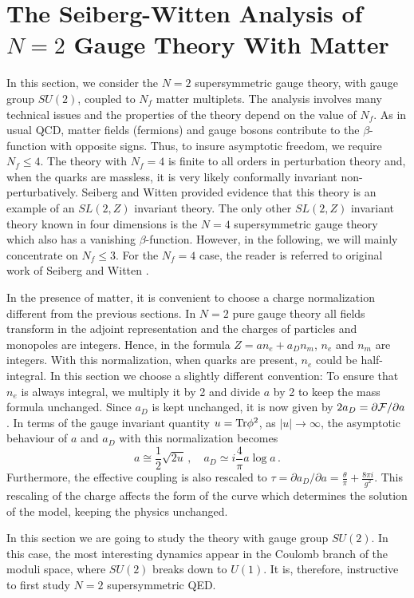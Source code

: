 \section{The Seiberg-Witten Analysis of $N=2$ Gauge Theory With Matter}

In this section, we consider the $N=2$ supersymmetric gauge theory,
with gauge group $SU(2)$, coupled to $N_f$ matter multiplets. The
analysis involves many technical issues and the properties of the
theory depend on the value of $N_f$. As in usual QCD, matter fields
(fermions) and gauge bosons contribute to the $\beta$-function with
opposite signs. Thus, to insure asymptotic freedom, we require $N_f
\leq 4$. The theory with $N_f =4$ is finite to all orders in
perturbation theory and, when the quarks are massless, it is very
likely conformally invariant non-perturbatively. Seiberg and Witten
provided evidence that this theory is an example of an $SL(2,Z)$
invariant theory. The only other $SL(2,Z)$ invariant theory known in
four dimensions is the $N=4$ supersymmetric gauge theory which also
has a vanishing $\beta$-function. However, in the following, we will
mainly concentrate on $N_f\leq 3$. For the $N_f=4$ case, the reader is
referred to original work of Seiberg and Witten \cite{SW2}.

In the presence of matter, it is convenient to choose a charge
normalization different from the previous sections. In $N=2$ pure
gauge theory all fields transform in the adjoint representation and
the charges of particles and monopoles are integers. Hence, in the
formula $Z=a n_e + a_D n_m$, $n_e$ and $n_m$ are integers. With this
normalization, when quarks are present, $n_e$ could be half-integral.
In this section we choose a slightly different convention: To ensure
that $n_e$ is always integral, we multiply it by 2 and divide $a$ by 2
to keep the mass formula unchanged. Since $a_D$ is kept unchanged, it
is now given by $2 a_D=\partial{\cal F}/\partial a$. In terms of the
gauge invariant quantity $u={\rm Tr}\phi^2$, as $|u|\rightarrow\infty$,
the asymptotic behaviour of $a$ and $a_D$ with this normalization
becomes 
$$
a \cong \frac{1}{2} \sqrt{2u}\,, \quad
a_D \simeq i \frac{4}{\pi} a \log a\,.
$$
Furthermore, the effective coupling is also rescaled to 
$\tau=\partial a_D/\partial a = \frac{\theta}{\pi} + \frac{8 \pi
i}{g^2}$. This rescaling of the charge affects the form of the curve
which determines the solution of the model, keeping the physics
unchanged.  

In this section we are going to study the theory with gauge group
$SU(2)$. In this case, the most interesting dynamics appear in the
Coulomb branch of the moduli space, where $SU(2)$ breaks down to 
$U(1)$. It is, therefore, instructive to first study $N = 2$
supersymmetric QED.

